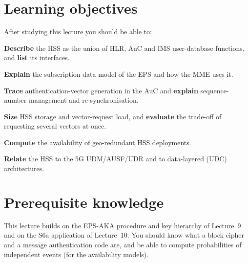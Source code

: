 \documentclass[11pt,a4paper]{article}
\begin{document}
\ACNcover

\section{Learning objectives}
After studying this lecture you should be able to:
\begin{objectives}
  \item \textbf{Describe} the HSS as the union of HLR, AuC and IMS user-database functions, and
        \textbf{list} its interfaces.
  \item \textbf{Explain} the subscription data model of the EPS and how the MME uses it.
  \item \textbf{Trace} authentication-vector generation in the AuC and \textbf{explain} sequence-number
        management and re-synchronisation.
  \item \textbf{Size} HSS storage and vector-request load, and \textbf{evaluate} the trade-off of
        requesting several vectors at once.
  \item \textbf{Compute} the availability of geo-redundant HSS deployments.
  \item \textbf{Relate} the HSS to the 5G UDM/AUSF/UDR and to data-layered (UDC) architectures.
\end{objectives}

\section{Prerequisite knowledge}
This lecture builds on the EPS-AKA procedure and key hierarchy of Lecture~9 and on the S6a application of
Lecture~10. You should know what a block cipher and a message authentication code are, and be able to
compute probabilities of independent events (for the availability models).
\end{document}
